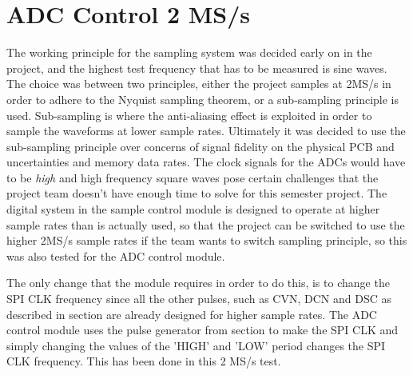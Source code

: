 \chapter{ADC Control 2 MS/s} \label{App:HSADCControlTest}

The working principle for the sampling system was decided early on in the project, and the highest test frequency that has to be measured is  sine waves. The choice was between two principles, either the project samples at 2MS/s in order to adhere to the Nyquist sampling theorem, or a sub-sampling principle is used. Sub-sampling is where the anti-aliasing effect is exploited in order to sample the waveforms at lower sample rates. Ultimately it was decided to use the sub-sampling principle over concerns of signal fidelity on the physical PCB and uncertainties and memory data rates. The clock signals for the ADCs would have to be \textit{high} and high frequency square waves pose certain challenges that the project team doesn't have enough time to solve for this semester project. The digital system in the sample control module is designed to operate at higher sample rates than is actually used, so that the project can be switched to use the higher 2MS/s sample rates if the team wants to switch sampling principle, so this was also tested for the ADC control module.

The only change that the module requires in order to do this, is to change the SPI CLK frequency since all the other pulses, such as CVN, DCN and DSC as described in section  are already designed for higher sample rates. The ADC control module uses the pulse generator from section  to make the SPI CLK and simply changing the values of the 'HIGH' and 'LOW' period changes the SPI CLK frequency. This has been done in this 2 MS/s test.

